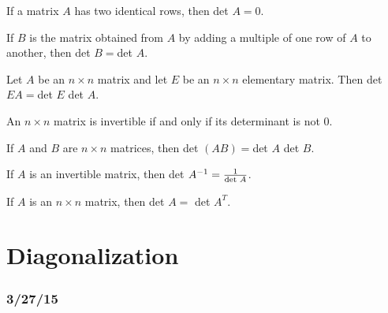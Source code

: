 \documentclass[english, 12pt]{article}
\begin{document}
\begin{thrm}
If a matrix $A$ has two identical rows, then det $A = 0$.
\end{thrm}

\begin{thrm}
If $B$ is the matrix obtained from $A$ by adding a multiple of one row of $A$ to another, then det $B = $det $A$.
\end{thrm}

\begin{thrm}
Let $A$ be an $n \times n$ matrix and let $E$ be an $n \times n$ elementary matrix. Then det $EA = $det $E$ det $A$.
\end{thrm}

\begin{thrm}
An $n \times n$ matrix is invertible if and only if its determinant is not $0$.
\end{thrm}

\begin{thrm}
If $A$ and $B$ are $n \times n$ matrices, then det $(AB) = $det $A$ det $B$.
\end{thrm}

\begin{thrm}
If $A$ is an invertible matrix, then det $A^{-1} = \frac{1}{\text{det }A}$.
\end{thrm}

\begin{thrm}
If $A$ is an $n \times n$ matrix, then det $A = $ det $A^T$.
\end{thrm}

\section{Diagonalization}

\subsubsection*{3/27/15}
\end{document}
